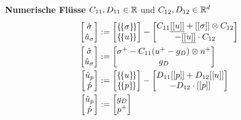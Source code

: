 \begin{definition}\textbf{Numerische Flüsse}\label{def:num_flusse}
    $C_{11},D_{11} \in \mathbb{R}$ und $C_{12},D_{12} \in \mathbb{R}^{d}$
    \begin{align}
        \begin{bmatrix} \hat{\sigma} \\ \hat{u}_\sigma \end{bmatrix} &:= 
            \begin{bmatrix} \{\hspace{-1.25pt}\{ \sigma \}\hspace{-1.25pt}\} \\ \{\hspace{-1.25pt}\{ u \}\hspace{-1.25pt}\} \end{bmatrix} 
            - \begin{bmatrix} C_{11}\underline{[[ u ]]} + [[ \sigma ]] \otimes C_{12} \\ -\underline{[[ u ]]} \cdot C_{12}\end{bmatrix} \\
        \begin{bmatrix} \hat{\sigma} \\ \hat{u}_\sigma \end{bmatrix} &:= 
            \begin{bmatrix} \sigma^+ - C_{11}(u^+ -g_D) \otimes n^+ \\ g_D \end{bmatrix} \\
        \begin{bmatrix} \hat{u}_p \\ \hat{p} \end{bmatrix} &:= 
            \begin{bmatrix} \{\hspace{-1.25pt}\{ u \}\hspace{-1.25pt}\} \\ \{\hspace{-1.25pt}\{ p \}\hspace{-1.25pt}\} \end{bmatrix} 
            - \begin{bmatrix} D_{11}[[ p ]] + D_{12}  [[ u ]] 
                   \\ - D_{12} \cdot [[ p ]]  
              \end{bmatrix} \\
        \begin{bmatrix} \hat{u}_p \\ \hat{p} \end{bmatrix} &:= 
            \begin{bmatrix} g_D \\ p^+ \end{bmatrix} \\            
    \end{align}

\end{definition}

